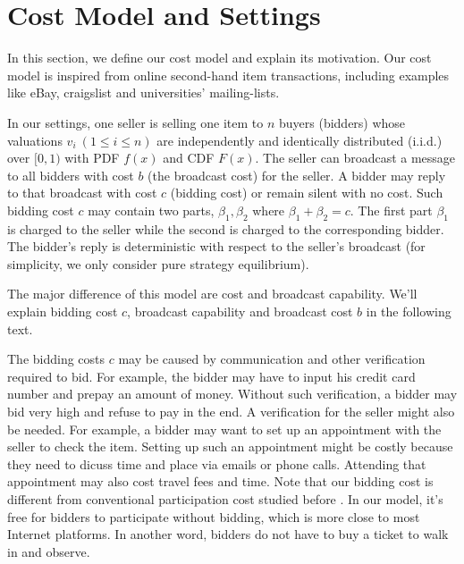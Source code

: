 \section{Cost Model and Settings}

In this section, we define our cost model and explain its motivation. Our
cost model is inspired from online second-hand item transactions, including
examples like eBay, craigslist and universities' mailing-lists.


\begin{definition}\label{def:model}

In our settings, one seller is selling one item to $n$ buyers (bidders)
whose valuations $v_i~(1 \leq i \leq n)$ are independently and identically
distributed (i.i.d.) over $[0, 1)$ with PDF $f(x)$ and CDF $F(x)$. The seller
can broadcast a message to all bidders with cost $b$ (the broadcast cost) for
the seller.  A bidder may reply to that broadcast with cost $c$ (bidding cost)
or remain silent with no cost. Such bidding cost $c$ may contain two parts,
$\beta_1, \beta_2$ where $\beta_1+\beta_2 = c$.  The first part $\beta_1$ is
charged to the seller while the second is charged to the corresponding bidder.
The bidder's reply is deterministic with respect to the seller's
broadcast (for simplicity, we only consider pure strategy equilibrium).

\end{definition}

The major difference of this model are cost and broadcast capability. We'll
explain bidding cost $c$, broadcast capability and broadcast cost $b$ in
the following text.

The bidding costs $c$ may be caused by communication and other verification
required to bid. For example, the bidder may have to input his credit card
number and prepay an amount of money. Without such verification, a bidder may
bid very high and refuse to pay in the end. A verification for the seller might
also be needed. For example, a bidder may want to set up an appointment with
the seller to check the item.  Setting up such an appointment might be costly
because they need to dicuss time and place via emails or phone calls.
Attending that appointment may also cost travel fees and time.  Note that our
bidding cost is different from conventional participation cost studied before
\cite{Stegeman95:ParticipationCost, Tan2006:EquilibriaParticipationCost}. In
our model, it's free for bidders to participate without bidding, which is more
close to most Internet platforms. In another word, bidders do not have to buy a
ticket to walk in and observe.

